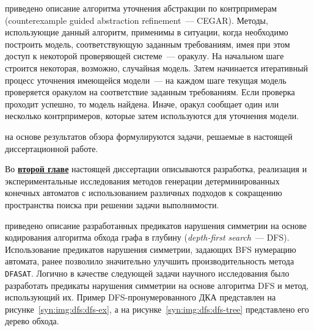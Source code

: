 \insection{\ref{sec:review:cegar}} приведено описание алгоритма уточнения абстракции по контрпримерам (counterexample guided abstraction refinement~{---} CEGAR). 
Методы, использующие данный алгоритм, применимы в ситуации, когда необходимо построить модель, соответствующую заданным требованиям, имея при этом доступ к некоторой проверяющей системе~--- оракулу. 
На начальном шаге строится некоторая, возможно, случайная модель.
Затем начинается итеративный процесс уточнения имеющейся модели~--- на каждом шаге текущая модель проверяется оракулом на соответствие заданным требованиям. 
Если проверка проходит успешно, то модель найдена.
Иначе, оракул сообщает один или несколько контрпримеров, которые затем используются для уточнения модели.

\insection{\ref{sec:review:tasks}} на основе результатов обзора формулируются задачи, решаемые в настоящей диссертационной работе.


Во \textbf{\underline{второй главе}} настоящей диссертации описываются разработка, реализация и экспериментальные исследования методов генерации детерминированных конечных автоматов с использованием различных подходов к сокращению пространства поиска при решении задачи выполнимости.

\insection{\ref{sec:space:dfs}} приведено описание разработанных предикатов нарушения симметрии на основе кодирования алгоритма обхода графа в глубину (\emph{depth-first search}~--- DFS). 
Использование предикатов нарушения симметрии, задающих BFS нумерацию автомата, ранее позволило значительно улучшить производительность метода \texttt{DFASAT}.
Логично в качестве следующей задачи научного исследования было разработать предикаты нарушения симметрии на основе алгоритма DFS и метод, использующий их.
Пример DFS-пронумерованного ДКА представлен на рисунке~\ref{syn:img:dfs:dfs-ex}, а на рисунке~\ref{syn:img:dfs:dfs-tree} представлено его дерево обхода.

